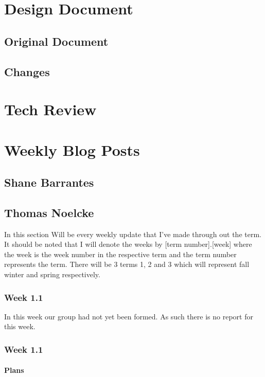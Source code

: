 \documentclass[onecolumn, draftclsnofoot,10pt, compsoc]{article}
\begin{document}
\section{Design Document}
    \subsection{Original Document}
        
    \subsection{Changes}
		
		
\section{Tech Review}
	

\section{Weekly Blog Posts}
    \subsection{Shane Barrantes}
    
    \subsection{Thomas Noelcke}
        In this section Will be every weekly update that I've made through out the term. It should be noted that I will denote the weeks by [term number].[week] where the week is the week number in the respective term and the term number represents the term. There will be 3 terms 1, 2 and 3 which will represent fall winter and spring respectively.\\ 
        
        \subsubsection {Week 1.1}
        In this week our group had not yet been formed. As such there is no report for this week.
    \subsubsection{Week 1.1}
		
		    \paragraph{Plans} \hfill \break
		    
\end{document}
